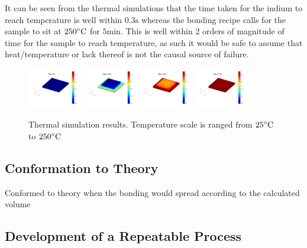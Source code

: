 It can be seen from the thermal simulations that the time taken for the indium to reach temperature is well within $0.3 \unit{\second}$ whereas the bonding recipe calls for the sample to sit at $250 \dC$ for $5 \unit{\minute}$. This is well within 2 orders of magnitude of time for the sample to reach temperature, as such it would be safe to assume that heat/temperature or lack thereof is not the causal source of failure.


\begin{figure}
    \includegraphics[width=0.21\textwidth]{Main/Ch2/heat/001.png}
    \includegraphics[width=0.21\textwidth]{Main/Ch2/heat/002.png}
    \includegraphics[width=0.21\textwidth]{Main/Ch2/heat/008.png}
    \includegraphics[width=0.21\textwidth]{Main/Ch2/heat/020.png}
    \caption{Thermal simulation results. Temperature scale is ranged from $25 \dC$ to $250 \dC$}
    \label{fig:thermal_simulations}
\end{figure}


\subsection{Conformation to Theory}
Conformed to theory when the bonding would spread according to the calculated volume

\subsection{Development of a Repeatable Process}
